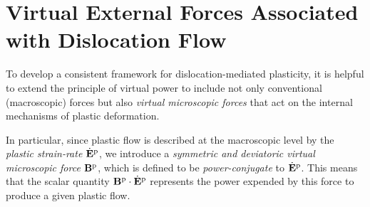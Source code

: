 %

\section{Virtual External Forces Associated with Dislocation Flow}

To develop a consistent framework for dislocation-mediated plasticity, it is helpful to extend the principle of virtual power to include not only conventional (macroscopic) forces but also \emph{virtual microscopic forces} that act on the internal mechanisms of plastic deformation.

In particular, since plastic flow is described at the macroscopic level by the \emph{plastic strain-rate} $\dot{\mathbf{E}}^{\rm p}$, we introduce a \emph{symmetric and deviatoric virtual microscopic force} $\mathbf{B}^{\rm p}$, which is defined to be \emph{power-conjugate} to $\dot{\mathbf{E}}^{\rm p}$. This means that the scalar quantity $\mathbf{B}^{\rm p} \cdot \dot{\mathbf{E}}^{\rm p}$ represents the power expended by this force to produce a given plastic flow.

